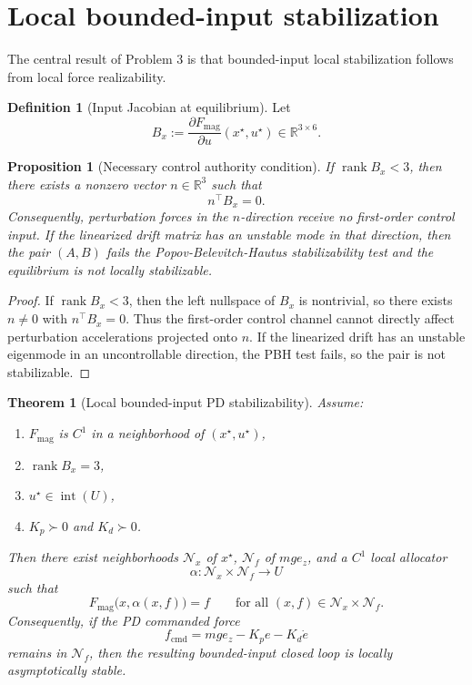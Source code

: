 \documentclass[11pt]{article}
\newtheorem{theorem}{Theorem}
\newtheorem{proposition}{Proposition}
\theoremstyle{definition}
\newtheorem{definition}{Definition}
\begin{document}
\section{Local bounded-input stabilization}

The central result of Problem 3 is that bounded-input local stabilization follows from local force realizability.

\begin{definition}[Input Jacobian at equilibrium]
Let
\begin{equation}
B_x := \frac{\partial F_{\mathrm{mag}}}{\partial u}(x^\star,u^\star) \in \mathbb{R}^{3\times 6}.
\label{eq:Bx}
\end{equation}
\end{definition}

\begin{proposition}[Necessary control authority condition]
If $\operatorname{rank} B_x < 3$, then there exists a nonzero vector $n \in \mathbb{R}^3$ such that
\[
n^\top B_x = 0.
\]
Consequently, perturbation forces in the $n$-direction receive no first-order control input. If the linearized drift matrix has an unstable mode in that direction, then the pair $(A,B)$ fails the Popov-Belevitch-Hautus stabilizability test and the equilibrium is not locally stabilizable.
\end{proposition}

\begin{proof}
If $\operatorname{rank}B_x < 3$, then the left nullspace of $B_x$ is nontrivial, so there exists $n \ne 0$ with $n^\top B_x = 0$. Thus the first-order control channel cannot directly affect perturbation accelerations projected onto $n$. If the linearized drift has an unstable eigenmode in an uncontrollable direction, the PBH test fails, so the pair is not stabilizable.
\end{proof}

\begin{theorem}[Local bounded-input PD stabilizability]
Assume:
\begin{enumerate}[label=\textbf{(A\arabic*)}, leftmargin=1.8em]
    \item $F_{\mathrm{mag}}$ is $C^1$ in a neighborhood of $(x^\star,u^\star)$,
    \item $\operatorname{rank} B_x = 3$,
    \item $u^\star \in \operatorname{int}(U)$,
    \item $K_p \succ 0$ and $K_d \succ 0$.
\end{enumerate}
Then there exist neighborhoods $\mathcal N_x$ of $x^\star$, $\mathcal N_f$ of $mg e_z$, and a $C^1$ local allocator
\[
\alpha : \mathcal N_x \times \mathcal N_f \to U
\]
such that
\begin{equation}
F_{\mathrm{mag}}\bigl(x,\alpha(x,f)\bigr) = f
\qquad \text{for all } (x,f) \in \mathcal N_x \times \mathcal N_f.
\label{eq:localalloc}
\end{equation}
Consequently, if the PD commanded force
\[
f_{\mathrm{cmd}} = mg e_z - K_p e - K_d \dot e
\]
remains in $\mathcal N_f$, then the resulting bounded-input closed loop is locally asymptotically stable.
\end{theorem}
\end{document}
